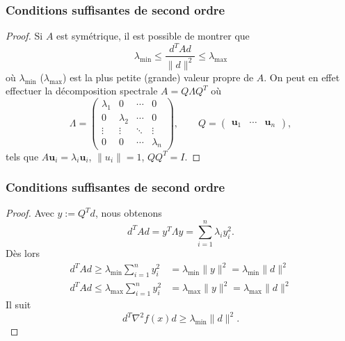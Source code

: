 \documentclass[usepdftitle=false]{beamer}
\def\bu{\boldsymbol{u}}
\begin{document}
\begin{frame}
\frametitle{Conditions suffisantes de second ordre}

\begin{proof}
Si $A$ est symétrique, il est possible de montrer que
$$
\lambda_{\min} \leq \frac{d^TAd}{\| d \|^2} \leq \lambda_{\max}
$$
où $\lambda_{\min}$ ($\lambda_{\max}$) est la plus petite (grande) valeur propre de $A$.
On peut en effet effectuer la décomposition spectrale
$
A = Q\Lambda Q^T
$
où
$$
\Lambda =
\begin{pmatrix}
\lambda_1 & 0 & \cdots & 0 \\
0 & \lambda_2 & \cdots & 0 \\
\vdots & \vdots & \ddots & \vdots \\
0 & 0 & \cdots & \lambda_n
\end{pmatrix}, \qquad
Q = \begin{pmatrix}
	\bu_1 & \cdots & \bu_n
	\end{pmatrix},
$$
tels que $A \bu_i = \lambda_i \bu_i$, $\|u_i\| = 1$, $QQ^T = I$.

\end{proof}

\end{frame}

\begin{frame}
\frametitle{Conditions suffisantes de second ordre}

\begin{proof}
Avec $y := Q^T d$, nous obtenons
$$
d^T A d = y^T \Lambda y = \sum_{i = 1}^n \lambda_i y_i^2.
$$
Dès lors
\begin{align*}
d^T A d \geq \lambda_{\min} \sum_{i = 1}^n y_i^2 &= \lambda_{\min} \| y \|^2
= \lambda_{\min} \| d \|^2 \\
d^T A d \leq \lambda_{\max} \sum_{i = 1}^n y_i^2 &= \lambda_{\max} \| y \|^2
= \lambda_{\max} \| d \|^2
\end{align*}
Il suit
$$
d^T \nabla^2 f(x) d \geq \lambda_{\min} \|d\|^2.
$$
\end{proof}

\end{frame}
\end{document}
